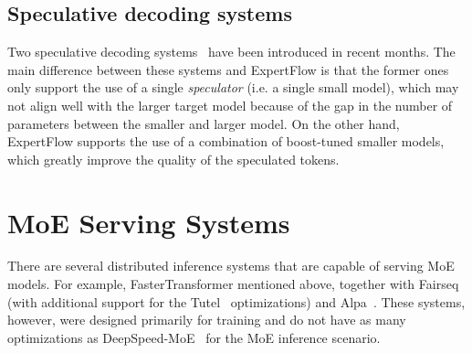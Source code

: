\subsection{Speculative decoding systems}
Two speculative decoding systems~\cite{speculative-decoding-berkeley, speculative-decoding-google} have been introduced in recent months. The main difference between these systems and ExpertFlow is that the former ones only support the use of a single \textit{speculator} (i.e. a single small model), which may not align well with the larger target model because of the gap in the number of parameters between the smaller and larger model. On the other hand, ExpertFlow supports the use of a combination of boost-tuned smaller models, which greatly improve the quality of the speculated tokens.

\section{MoE Serving Systems}\label{chpt2-moe-serving}
There are several distributed inference systems that are capable of serving MoE models. For example, FasterTransformer mentioned above, together with Fairseq~\cite{fairseq} (with additional support for the Tutel~\cite{tutel} optimizations) and Alpa~\cite{alpa}. These systems, however, were designed primarily for training and do not have as many optimizations as DeepSpeed-MoE~\cite{deepspeed-moe} for the MoE inference scenario.

